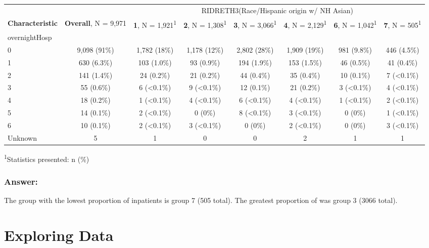 \documentclass[]{article}
\begin{document}
\captionsetup[table]{labelformat=empty,skip=1pt}
\begin{longtable}{lccccccc}
\toprule
& & \multicolumn{6}{c}{RIDRETH3(Race/Hispanic origin w/ NH Asian)} \\ 
 \cmidrule(lr){3-8}
\textbf{Characteristic} & \textbf{Overall}, N = 9,971 & \textbf{1}, N = 1,921\textsuperscript{1} & \textbf{2}, N = 1,308\textsuperscript{1} & \textbf{3}, N = 3,066\textsuperscript{1} & \textbf{4}, N = 2,129\textsuperscript{1} & \textbf{6}, N = 1,042\textsuperscript{1} & \textbf{7}, N = 505\textsuperscript{1} \\ 
\midrule
overnightHosp &  &  &  &  &  &  &  \\ 
0 & 9,098 (91\%) & 1,782 (18\%) & 1,178 (12\%) & 2,802 (28\%) & 1,909 (19\%) & 981 (9.8\%) & 446 (4.5\%) \\ 
1 & 630 (6.3\%) & 103 (1.0\%) & 93 (0.9\%) & 194 (1.9\%) & 153 (1.5\%) & 46 (0.5\%) & 41 (0.4\%) \\ 
2 & 141 (1.4\%) & 24 (0.2\%) & 21 (0.2\%) & 44 (0.4\%) & 35 (0.4\%) & 10 (0.1\%) & 7 (<0.1\%) \\ 
3 & 55 (0.6\%) & 6 (<0.1\%) & 9 (<0.1\%) & 12 (0.1\%) & 21 (0.2\%) & 3 (<0.1\%) & 4 (<0.1\%) \\ 
4 & 18 (0.2\%) & 1 (<0.1\%) & 4 (<0.1\%) & 6 (<0.1\%) & 4 (<0.1\%) & 1 (<0.1\%) & 2 (<0.1\%) \\ 
5 & 14 (0.1\%) & 2 (<0.1\%) & 0 (0\%) & 8 (<0.1\%) & 3 (<0.1\%) & 0 (0\%) & 1 (<0.1\%) \\ 
6 & 10 (0.1\%) & 2 (<0.1\%) & 3 (<0.1\%) & 0 (0\%) & 2 (<0.1\%) & 0 (0\%) & 3 (<0.1\%) \\ 
Unknown & 5 & 1 & 0 & 0 & 2 & 1 & 1 \\ 
\bottomrule
\end{longtable}
\vspace{-5mm}
\begin{minipage}{\linewidth}
\textsuperscript{1}Statistics presented: n (\%) \\ 
\end{minipage}

\hypertarget{answer-3}{%
\subsubsection{Answer:}\label{answer-3}}

The group with the lowest proportion of inpatients is group 7 (505
total). The greatest proportion of was group 3 (3066 total).

\hypertarget{exploring-data}{%
\section{Exploring Data}\label{exploring-data}}
\end{document}
